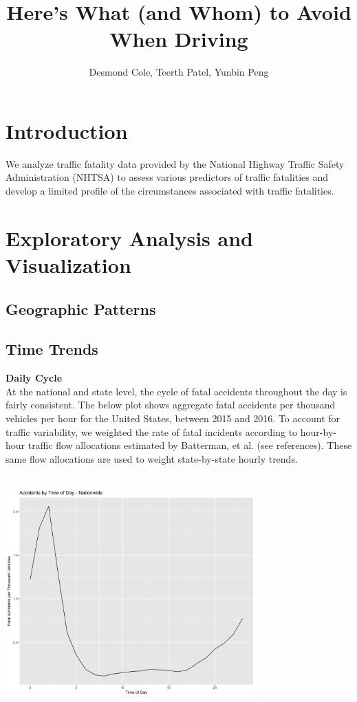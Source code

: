 \documentclass[11pt, oneside]{article}   	%
\title{Here's What (and Whom) to Avoid When Driving}
\author{Desmond Cole, Teerth Patel, Yunbin Peng}
\begin{document}
\maketitle
\section*{Introduction}
We analyze traffic fatality data provided by the National Highway Traffic Safety Administration (NHTSA) to assess various predictors of traffic fatalities and develop a limited profile of the circumstances associated with traffic fatalities.

\section*{Exploratory Analysis and Visualization}

\subsection*{Geographic Patterns}

\subsection*{Time Trends}
\textbf{Daily Cycle} \\
At the national and state level, the cycle of fatal accidents throughout the day is fairly consistent. The below plot shows aggregate fatal accidents per thousand vehicles per hour for the United States, between 2015 and 2016. To account for traffic variability, we weighted the rate of fatal incidents according to hour-by-hour traffic flow allocations estimated by Batterman, et al. (see references). These same flow allocations are used to weight state-by-state hourly trends. \\
\\
\begin{center}
\includegraphics[width=.75\textwidth,height=8cm,keepaspectratio]{WeightedNationalDayTrends.png}
\end{center}
\end{document}
